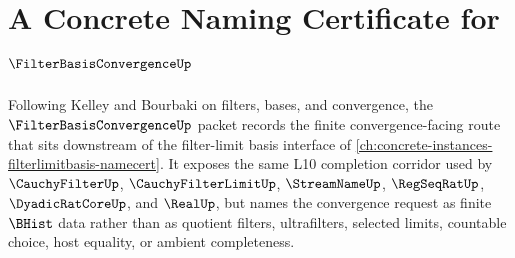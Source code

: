 \chapter{A Concrete Naming Certificate for $\FilterBasisConvergenceUp$}
\label{ch:concrete-instances-filter-basis-convergence-namecert}

Following Kelley and Bourbaki on filters, bases, and convergence, the $\FilterBasisConvergenceUp$ packet records the finite convergence-facing route that sits downstream of the filter-limit basis interface of \autoref{ch:concrete-instances-filterlimitbasis-namecert}. It exposes the same L10 completion corridor used by $\CauchyFilterUp$, $\CauchyFilterLimitUp$, $\StreamNameUp$, $\RegSeqRatUp$, $\DyadicRatCoreUp$, and $\RealUp$, but names the convergence request as finite $\BHist$ data rather than as quotient filters, ultrafilters, selected limits, countable choice, host equality, or ambient completeness.

